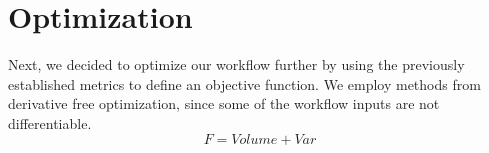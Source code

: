 \section{Optimization}

Next, we decided to optimize our workflow further by using the previously established metrics to define an objective function. We employ methods from derivative free optimization, since some of the workflow inputs are not differentiable.
\begin{equation}
  F  = Volume + Var
\end{equation}
